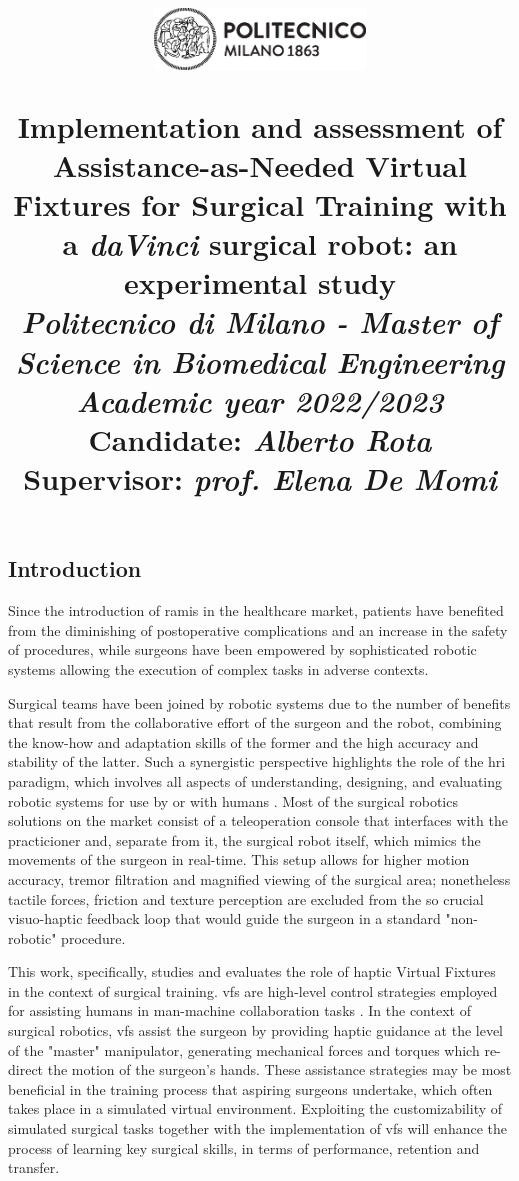 \documentclass{article}
\title{
\begin{figure}[h!]
\centering
\includegraphics[width=0.5\textwidth]{images/logo_polimi_scritta2.eps}
\end{figure}
\textbf{Implementation and assessment of Assistance-as-Needed Virtual Fixtures for Surgical Training with a \textit{daVinci} surgical robot: an experimental study}
\\
\vspace{0.5cm}\large{\textit{Politecnico di Milano - Master of Science in Biomedical Engineering}}
\\
\vspace{0.5cm}\textit{\small{Academic year 2022/2023}}\vspace{0.5cm}\\
{\large \textbf{Candidate: \textit{Alberto Rota}}\\
\textbf{Supervisor: \textit{prof. Elena De Momi}}}}
\author{}
\date{}
\begin{document}
\maketitle

\begin{multicols}{2}


\section{Introduction}
Since the introduction of \ac{ramis} in the healthcare market, patients have benefited from the diminishing of postoperative complications and an increase in the safety of procedures, while surgeons have been empowered by sophisticated robotic systems allowing the execution of complex tasks in adverse contexts. 

Surgical teams have been joined by robotic systems due to the number of benefits that result from the collaborative effort of the surgeon and the robot, combining the know-how and adaptation skills of the former and the high accuracy and stability of the latter. Such a synergistic perspective highlights the role of the \ac{hri} paradigm, which involves all aspects of understanding, designing, and evaluating robotic systems for use by or with humans \cite{Goodrich2007}. Most of the surgical robotics solutions on the market consist of a teleoperation console that interfaces with the practicioner and, separate from it, the surgical robot itself, which mimics the movements of the surgeon in real-time. This setup allows for higher motion accuracy, tremor filtration and magnified viewing of the surgical area; nonetheless tactile forces, friction and texture perception are excluded from the so crucial visuo-haptic feedback loop that would guide the surgeon in a standard "non-robotic" procedure.

This work, specifically, studies and evaluates the role of haptic Virtual Fixtures in the context of surgical training. \acp{vf} are high-level control strategies employed for assisting humans in man-machine collaboration tasks \cite{Bowyer2014}. In the context of surgical robotics, \acp{vf} assist the surgeon by providing haptic guidance at the level of the "master" manipulator, generating mechanical forces and torques which re-direct the motion of the surgeon's hands. These assistance strategies may be most beneficial in the training process that aspiring surgeons undertake, which often takes place in a simulated virtual environment. Exploiting the customizability of simulated surgical tasks together with the implementation of \acp{vf} will enhance the process of learning key surgical skills, in terms of performance, retention and transfer.




\end{multicols}
\end{document}
